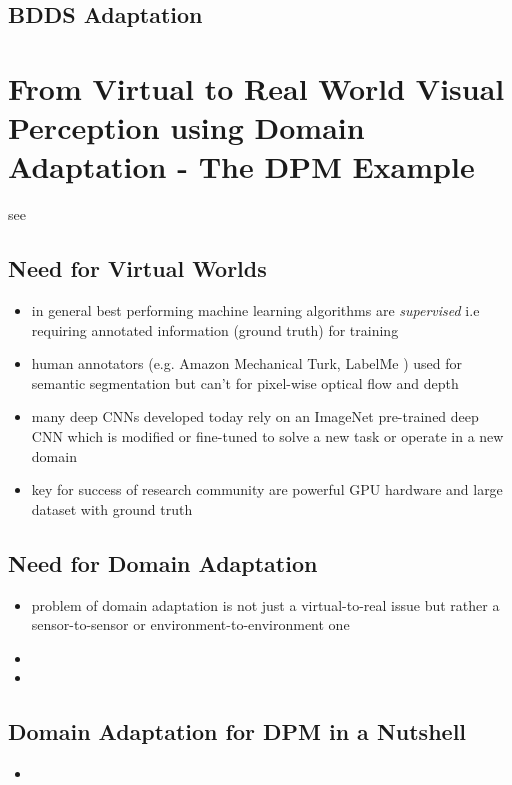 \subsection{BDDS Adaptation}



\section{From Virtual to Real World Visual Perception using Domain Adaptation - The DPM Example}

see \cite{DBLP:journals/corr/LopezXGVR16}

\subsection{Need for Virtual Worlds}
\begin{itemize}
	\item in general best performing machine learning algorithms are \textit{supervised} i.e requiring annotated information (ground truth) for training
	\item human annotators (e.g. Amazon Mechanical Turk, LabelMe ) used for semantic segmentation but can't for pixel-wise optical flow and depth
	\item many deep CNNs developed today rely on an ImageNet pre-trained deep CNN which is modified or fine-tuned to solve a new task or operate in a new domain
	\item key for success of research community are powerful GPU hardware and large dataset with ground truth
\end{itemize}

\subsection{Need for Domain Adaptation}
\begin{itemize}
	\item problem of domain adaptation is not just a virtual-to-real issue but rather a sensor-to-sensor or environment-to-environment one 
	\item {}
	\item {}
\end{itemize}

\subsection{Domain Adaptation for DPM in a Nutshell}
\begin{itemize}
	\item {}
\end{itemize}


